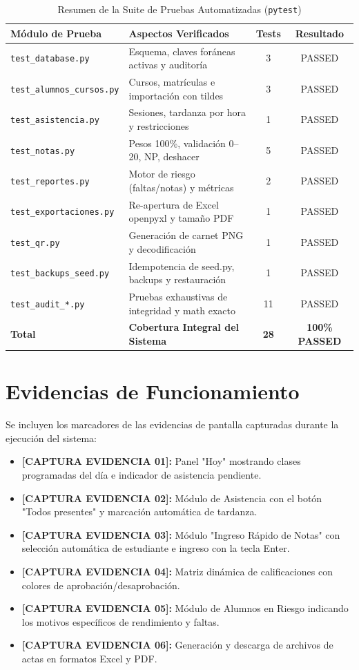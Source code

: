 \documentclass[12pt,a4paper]{article}
\begin{document}
\begin{table}[h!]
\centering
\caption{Resumen de la Suite de Pruebas Automatizadas (\texttt{pytest})}
\begin{tabularx}{\textwidth}{l X c c}
\toprule
\textbf{Módulo de Prueba} & \textbf{Aspectos Verificados} & \textbf{Tests} & \textbf{Resultado} \\
\midrule
\texttt{test\_database.py} & Esquema, claves foráneas activas y auditoría & 3 & PASSED \\
\texttt{test\_alumnos\_cursos.py} & Cursos, matrículas e importación con tildes & 3 & PASSED \\
\texttt{test\_asistencia.py} & Sesiones, tardanza por hora y restricciones & 1 & PASSED \\
\texttt{test\_notas.py} & Pesos 100\%, validación 0--20, NP, deshacer & 5 & PASSED \\
\texttt{test\_reportes.py} & Motor de riesgo (faltas/notas) y métricas & 2 & PASSED \\
\texttt{test\_exportaciones.py} & Re-apertura de Excel openpyxl y tamaño PDF & 1 & PASSED \\
\texttt{test\_qr.py} & Generación de carnet PNG y decodificación & 1 & PASSED \\
\texttt{test\_backups\_seed.py} & Idempotencia de seed.py, backups y restauración & 1 & PASSED \\
\texttt{test\_audit\_*.py} & Pruebas exhaustivas de integridad y math exacto & 11 & PASSED \\
\midrule
\textbf{Total} & \textbf{Cobertura Integral del Sistema} & \textbf{28} & \textbf{100\% PASSED} \\
\bottomrule
\end{tabularx}
\end{table}

\section{Evidencias de Funcionamiento}
Se incluyen los marcadores de las evidencias de pantalla capturadas durante la ejecución del sistema:
\begin{itemize}
    \item \textbf{[CAPTURA EVIDENCIA 01]:} Panel "Hoy" mostrando clases programadas del día e indicador de asistencia pendiente.
    \item \textbf{[CAPTURA EVIDENCIA 02]:} Módulo de Asistencia con el botón "Todos presentes" y marcación automática de tardanza.
    \item \textbf{[CAPTURA EVIDENCIA 03]:} Módulo "Ingreso Rápido de Notas" con selección automática de estudiante e ingreso con la tecla Enter.
    \item \textbf{[CAPTURA EVIDENCIA 04]:} Matriz dinámica de calificaciones con colores de aprobación/desaprobación.
    \item \textbf{[CAPTURA EVIDENCIA 05]:} Módulo de Alumnos en Riesgo indicando los motivos específicos de rendimiento y faltas.
    \item \textbf{[CAPTURA EVIDENCIA 06]:} Generación y descarga de archivos de actas en formatos Excel y PDF.
\end{itemize}
\end{document}

